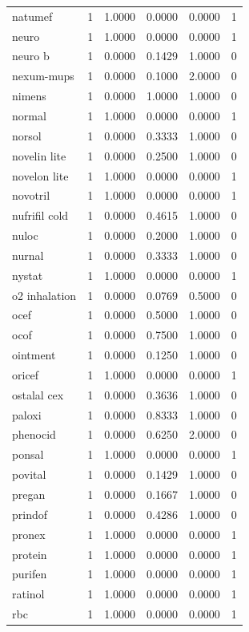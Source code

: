 \begin{longtable}{p{3.0cm}rrrrr}
natumef & 1 & 1.0000 & 0.0000 & 0.0000 & 1 \\
neuro & 1 & 1.0000 & 0.0000 & 0.0000 & 1 \\
neuro b & 1 & 0.0000 & 0.1429 & 1.0000 & 0 \\
nexum-mups & 1 & 0.0000 & 0.1000 & 2.0000 & 0 \\
nimens & 1 & 0.0000 & 1.0000 & 1.0000 & 0 \\
normal & 1 & 1.0000 & 0.0000 & 0.0000 & 1 \\
norsol & 1 & 0.0000 & 0.3333 & 1.0000 & 0 \\
novelin lite & 1 & 0.0000 & 0.2500 & 1.0000 & 0 \\
novelon lite & 1 & 1.0000 & 0.0000 & 0.0000 & 1 \\
novotril & 1 & 1.0000 & 0.0000 & 0.0000 & 1 \\
nufrifil cold & 1 & 0.0000 & 0.4615 & 1.0000 & 0 \\
nuloc & 1 & 0.0000 & 0.2000 & 1.0000 & 0 \\
nurnal & 1 & 0.0000 & 0.3333 & 1.0000 & 0 \\
nystat & 1 & 1.0000 & 0.0000 & 0.0000 & 1 \\
o2 inhalation & 1 & 0.0000 & 0.0769 & 0.5000 & 0 \\
ocef & 1 & 0.0000 & 0.5000 & 1.0000 & 0 \\
ocof & 1 & 0.0000 & 0.7500 & 1.0000 & 0 \\
ointment & 1 & 0.0000 & 0.1250 & 1.0000 & 0 \\
oricef & 1 & 1.0000 & 0.0000 & 0.0000 & 1 \\
ostalal cex & 1 & 0.0000 & 0.3636 & 1.0000 & 0 \\
paloxi & 1 & 0.0000 & 0.8333 & 1.0000 & 0 \\
phenocid & 1 & 0.0000 & 0.6250 & 2.0000 & 0 \\
ponsal & 1 & 1.0000 & 0.0000 & 0.0000 & 1 \\
povital & 1 & 0.0000 & 0.1429 & 1.0000 & 0 \\
pregan & 1 & 0.0000 & 0.1667 & 1.0000 & 0 \\
prindof & 1 & 0.0000 & 0.4286 & 1.0000 & 0 \\
pronex & 1 & 1.0000 & 0.0000 & 0.0000 & 1 \\
protein & 1 & 1.0000 & 0.0000 & 0.0000 & 1 \\
purifen & 1 & 1.0000 & 0.0000 & 0.0000 & 1 \\
ratinol & 1 & 1.0000 & 0.0000 & 0.0000 & 1 \\
rbc & 1 & 1.0000 & 0.0000 & 0.0000 & 1 \\

\end{longtable}
